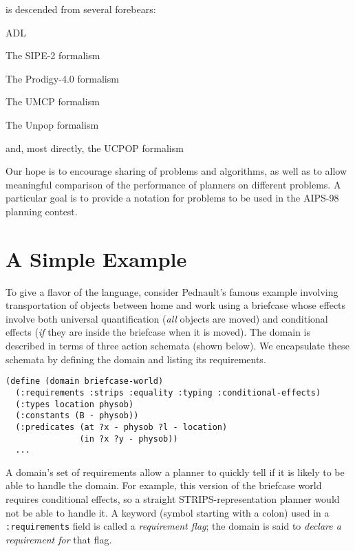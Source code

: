 \lang{} is descended from several forebears:
\bi
  \item ADL~\cite{pednault-kr89}
  \item The SIPE-2 formalism~\cite{wilkins88}
  \item The Prodigy-4.0 formalism~\cite{prodigy4.0-manual}
  \item The UMCP formalism~\cite{erol-aips-94}
  \item The Unpop formalism~\cite{mcdermott96}
  \item and, most directly, the UCPOP formalism~\cite{ucpop-manual-4}
\ei

Our hope is to encourage sharing of problems and algorithms, as well as 
to allow meaningful comparison of the performance of planners on different 
problems.  A particular goal is to provide a notation for problems to be used
in the AIPS-98 planning contest.



    \section{A Simple Example}

To give a flavor of the language, consider Pednault's famous example
\cite{pednault-ci88} involving transportation of objects between home and
work using a briefcase whose effects involve both universal quantification
({\it all} objects are moved) and conditional effects ({\it if} they are
inside the briefcase when it is moved).  The domain is described in terms
of three action schemata (shown below). We encapsulate these schemata by
defining the domain and listing its requirements.

\begin{verbatim}
(define (domain briefcase-world)
  (:requirements :strips :equality :typing :conditional-effects)
  (:types location physob)
  (:constants (B - physob))
  (:predicates (at ?x - physob ?l - location)
               (in ?x ?y - physob))
  ...
\end{verbatim}

A domain's set of requirements allow a planner to quickly tell if it is
likely to be able to handle the domain. For example, this version of the
briefcase world requires conditional effects, so a straight
STRIPS-representation planner would not be able to handle it. A
keyword (symbol starting with a colon)
used in a {\tt :requirements} field is called a {\em requirement flag}; the
domain is said to {\em declare a requirement for} that flag.  

